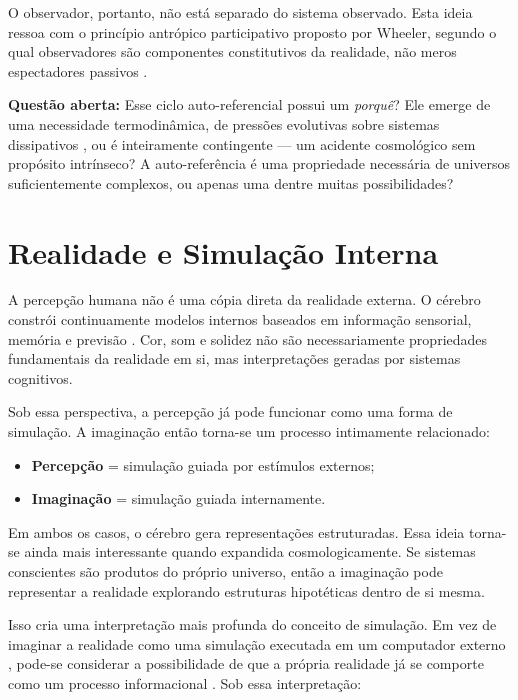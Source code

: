 \documentclass[12pt,a4paper]{article}
\begin{document}
O observador, portanto, não está separado do sistema observado.
Esta ideia ressoa com o princípio antrópico participativo proposto por
Wheeler, segundo o qual observadores são componentes constitutivos da
realidade, não meros espectadores passivos \citep{wheeler1990}.

\begin{tcolorbox}[questionbox]
  \textbf{Questão aberta:} Esse ciclo auto-referencial possui um
  \textit{porquê}? Ele emerge de uma necessidade termodinâmica, de pressões
  evolutivas sobre sistemas dissipativos \citep{england2013}, ou é
  inteiramente contingente — um acidente cosmológico sem propósito intrínseco?
  A auto-referência é uma propriedade necessária de universos suficientemente
  complexos, ou apenas uma dentre muitas possibilidades?
\end{tcolorbox}

\section{Realidade e Simulação Interna}

A percepção humana não é uma cópia direta da realidade externa. O cérebro
constrói continuamente modelos internos baseados em informação sensorial,
memória e previsão \citep{clark2016}. Cor, som e solidez não são
necessariamente propriedades fundamentais da realidade em si, mas
interpretações geradas por sistemas cognitivos.

Sob essa perspectiva, a percepção já pode funcionar como uma forma de
simulação. A imaginação então torna-se um processo intimamente relacionado:

\begin{itemize}
  \item \textbf{Percepção} = simulação guiada por estímulos externos;
  \item \textbf{Imaginação} = simulação guiada internamente.
\end{itemize}

Em ambos os casos, o cérebro gera representações estruturadas. Essa ideia
torna-se ainda mais interessante quando expandida cosmologicamente. Se sistemas
conscientes são produtos do próprio universo, então a imaginação pode
representar a realidade explorando estruturas hipotéticas dentro de si mesma.

Isso cria uma interpretação mais profunda do conceito de simulação. Em vez
de imaginar a realidade como uma simulação executada em um computador externo
\citep{bostrom2003}, pode-se considerar a possibilidade de que a própria
realidade já se comporte como um processo informacional \citep{lloyd2006}.
Sob essa interpretação:
\end{document}

